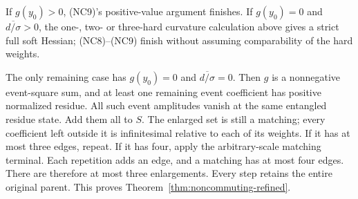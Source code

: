 If $g(y_0)>0$, (NC9)'s positive-value argument finishes. If $g(y_0)=0$
and $\overline{d/\sigma}>0$, the one-, two- or three-hard curvature
calculation above gives a strict full soft Hessian; (NC8)--(NC9)
finish without assuming comparability of the hard weights.

The only remaining case has $g(y_0)=0$ and
$\overline{d/\sigma}=0$. Then $g$ is a nonnegative event-square
sum, and at least one remaining event coefficient has positive
normalized residue. All such event amplitudes vanish at the same
entangled residue state. Add them all to $S$. The enlarged set is
still a matching; every coefficient left outside it is infinitesimal
relative to each of its weights. If it has at most three edges, repeat.
If it has four, apply the arbitrary-scale matching terminal.
Each repetition adds an edge, and a matching has at most four edges.
There are therefore at most three enlargements. Every step retains
the entire original parent. This proves
Theorem~\ref{thm:noncommuting-refined}.

